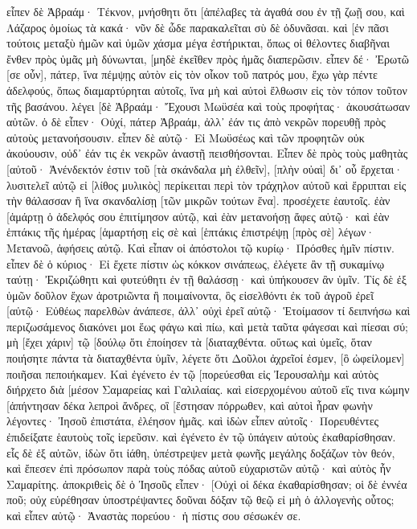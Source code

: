 εἶπεν δὲ Ἀβραάμ· Τέκνον, μνήσθητι ὅτι [ἀπέλαβες τὰ ἀγαθά σου ἐν τῇ ζωῇ σου, καὶ Λάζαρος ὁμοίως τὰ κακά· νῦν δὲ ὧδε παρακαλεῖται σὺ δὲ ὀδυνᾶσαι. 
καὶ [ἐν πᾶσι τούτοις μεταξὺ ἡμῶν καὶ ὑμῶν χάσμα μέγα ἐστήρικται, ὅπως οἱ θέλοντες διαβῆναι ἔνθεν πρὸς ὑμᾶς μὴ δύνωνται, [μηδὲ ἐκεῖθεν πρὸς ἡμᾶς διαπερῶσιν. 
εἶπεν δέ· Ἐρωτῶ [σε οὖν], πάτερ, ἵνα πέμψῃς αὐτὸν εἰς τὸν οἶκον τοῦ πατρός μου, 
ἔχω γὰρ πέντε ἀδελφούς, ὅπως διαμαρτύρηται αὐτοῖς, ἵνα μὴ καὶ αὐτοὶ ἔλθωσιν εἰς τὸν τόπον τοῦτον τῆς βασάνου. 
λέγει [δὲ Ἀβραάμ· Ἔχουσι Μωϋσέα καὶ τοὺς προφήτας· ἀκουσάτωσαν αὐτῶν. 
ὁ δὲ εἶπεν· Οὐχί, πάτερ Ἀβραάμ, ἀλλ᾽ ἐάν τις ἀπὸ νεκρῶν πορευθῇ πρὸς αὐτοὺς μετανοήσουσιν. 
εἶπεν δὲ αὐτῷ· Εἰ Μωϋσέως καὶ τῶν προφητῶν οὐκ ἀκούουσιν, οὐδ᾽ ἐάν τις ἐκ νεκρῶν ἀναστῇ πεισθήσονται. 
Εἶπεν δὲ πρὸς τοὺς μαθητὰς [αὐτοῦ· Ἀνένδεκτόν ἐστιν τοῦ [τὰ σκάνδαλα μὴ ἐλθεῖν], [πλὴν οὐαὶ] δι᾽ οὗ ἔρχεται· 
λυσιτελεῖ αὐτῷ εἰ [λίθος μυλικὸς] περίκειται περὶ τὸν τράχηλον αὐτοῦ καὶ ἔρριπται εἰς τὴν θάλασσαν ἢ ἵνα σκανδαλίσῃ [τῶν μικρῶν τούτων ἕνα]. 
προσέχετε ἑαυτοῖς. ἐὰν [ἁμάρτῃ ὁ ἀδελφός σου ἐπιτίμησον αὐτῷ, καὶ ἐὰν μετανοήσῃ ἄφες αὐτῷ· 
καὶ ἐὰν ἑπτάκις τῆς ἡμέρας [ἁμαρτήσῃ εἰς σὲ καὶ [ἑπτάκις ἐπιστρέψῃ [πρὸς σὲ] λέγων· Μετανοῶ, ἀφήσεις αὐτῷ. 
Καὶ εἶπαν οἱ ἀπόστολοι τῷ κυρίῳ· Πρόσθες ἡμῖν πίστιν. 
εἶπεν δὲ ὁ κύριος· Εἰ ἔχετε πίστιν ὡς κόκκον σινάπεως, ἐλέγετε ἂν τῇ συκαμίνῳ ταύτῃ· Ἐκριζώθητι καὶ φυτεύθητι ἐν τῇ θαλάσσῃ· καὶ ὑπήκουσεν ἂν ὑμῖν. 
Τίς δὲ ἐξ ὑμῶν δοῦλον ἔχων ἀροτριῶντα ἢ ποιμαίνοντα, ὃς εἰσελθόντι ἐκ τοῦ ἀγροῦ ἐρεῖ [αὐτῷ· Εὐθέως παρελθὼν ἀνάπεσε, 
ἀλλ᾽ οὐχὶ ἐρεῖ αὐτῷ· Ἑτοίμασον τί δειπνήσω καὶ περιζωσάμενος διακόνει μοι ἕως φάγω καὶ πίω, καὶ μετὰ ταῦτα φάγεσαι καὶ πίεσαι σύ; 
μὴ [ἔχει χάριν] τῷ [δούλῳ ὅτι ἐποίησεν τὰ [διαταχθέντα. 
οὕτως καὶ ὑμεῖς, ὅταν ποιήσητε πάντα τὰ διαταχθέντα ὑμῖν, λέγετε ὅτι Δοῦλοι ἀχρεῖοί ἐσμεν, [ὃ ὠφείλομεν] ποιῆσαι πεποιήκαμεν. 
Καὶ ἐγένετο ἐν τῷ [πορεύεσθαι εἰς Ἰερουσαλὴμ καὶ αὐτὸς διήρχετο διὰ [μέσον Σαμαρείας καὶ Γαλιλαίας. 
καὶ εἰσερχομένου αὐτοῦ εἴς τινα κώμην [ἀπήντησαν δέκα λεπροὶ ἄνδρες, οἳ [ἔστησαν πόρρωθεν, 
καὶ αὐτοὶ ἦραν φωνὴν λέγοντες· Ἰησοῦ ἐπιστάτα, ἐλέησον ἡμᾶς. 
καὶ ἰδὼν εἶπεν αὐτοῖς· Πορευθέντες ἐπιδείξατε ἑαυτοὺς τοῖς ἱερεῦσιν. καὶ ἐγένετο ἐν τῷ ὑπάγειν αὐτοὺς ἐκαθαρίσθησαν. 
εἷς δὲ ἐξ αὐτῶν, ἰδὼν ὅτι ἰάθη, ὑπέστρεψεν μετὰ φωνῆς μεγάλης δοξάζων τὸν θεόν, 
καὶ ἔπεσεν ἐπὶ πρόσωπον παρὰ τοὺς πόδας αὐτοῦ εὐχαριστῶν αὐτῷ· καὶ αὐτὸς ἦν Σαμαρίτης. 
ἀποκριθεὶς δὲ ὁ Ἰησοῦς εἶπεν· [Οὐχὶ οἱ δέκα ἐκαθαρίσθησαν; οἱ δὲ ἐννέα ποῦ; 
οὐχ εὑρέθησαν ὑποστρέψαντες δοῦναι δόξαν τῷ θεῷ εἰ μὴ ὁ ἀλλογενὴς οὗτος; 
καὶ εἶπεν αὐτῷ· Ἀναστὰς πορεύου· ἡ πίστις σου σέσωκέν σε. 
